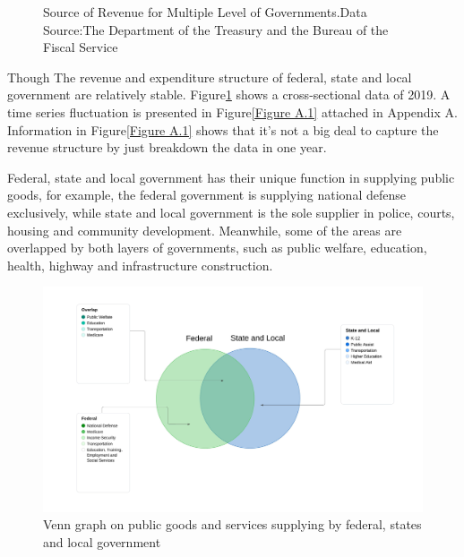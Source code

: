\begin{figure}[H]
    \caption[Source of Revenue for Multiple Level of Governments in 2019]{Source of Revenue for Multiple Level of Governments.Data Source:The Department of the Treasury and the Bureau of the Fiscal Service }    %
    \label{Figure 1.3}
\end{figure}

Though The revenue and expenditure structure of federal, state and local government are relatively stable. Figure\ref*{Figure 1.3} shows a cross-sectional data of 2019. A time series fluctuation is presented in Figure\ref*{Figure A.1} attached in Appendix A. Information in Figure\ref*{Figure A.1} shows that it's not a big deal to capture the revenue structure by just breakdown the data in one year.


Federal, state and local government has their unique function in supplying public goods, for example, the federal government is supplying national defense exclusively, while state and local government is the sole supplier in police, courts, housing and community development. Meanwhile, some of the areas are overlapped by both layers of governments, such as public welfare, education, health, highway and infrastructure construction.

\begin{figure}[H]
    \centering
    \includegraphics[scale=0.4]{Chapter-1/Figures/Venn graph on public goods.jpeg}
    \caption[Venn graph on public goods and services supplying]{Venn graph on public goods and services supplying by federal, states and local government
        \texttt{} }
    \label{Figure 1.4}
\end{figure}

